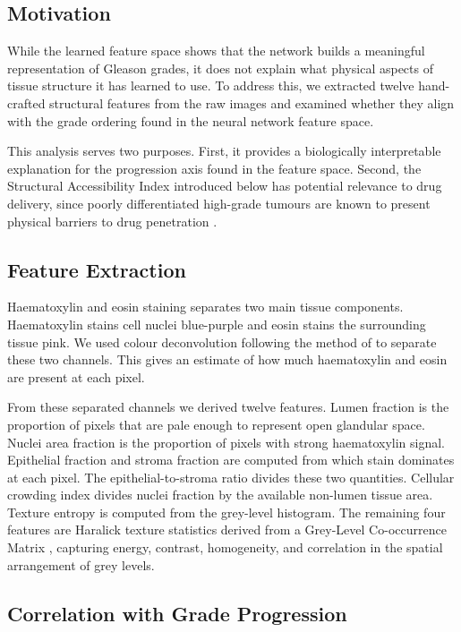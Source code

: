 \documentclass[12pt, a4paper]{article}
\begin{document}
\subsection{Motivation}

While the learned feature space shows that the network builds a meaningful
representation of Gleason grades, it does not explain what physical aspects of
tissue structure it has learned to use. To address this, we extracted twelve
hand-crafted structural features from the raw images and examined whether they
align with the grade ordering found in the neural network feature space.

This analysis serves two purposes. First, it provides a biologically interpretable
explanation for the progression axis found in the feature space. Second, the
Structural Accessibility Index introduced below has potential relevance to drug
delivery, since poorly differentiated high-grade tumours are known to present
physical barriers to drug penetration \citep{minchinton2006}.

\subsection{Feature Extraction}

Haematoxylin and eosin staining separates two main tissue components. Haematoxylin
stains cell nuclei blue-purple and eosin stains the surrounding tissue pink. We
used colour deconvolution following the method of \citet{ruifrok2001} to separate
these two channels. This gives an estimate of how much haematoxylin and eosin are
present at each pixel.

From these separated channels we derived twelve features. Lumen fraction is the
proportion of pixels that are pale enough to represent open glandular space.
Nuclei area fraction is the proportion of pixels with strong haematoxylin signal.
Epithelial fraction and stroma fraction are computed from which stain dominates
at each pixel. The epithelial-to-stroma ratio divides these two quantities.
Cellular crowding index divides nuclei fraction by the available non-lumen tissue
area. Texture entropy is computed from the grey-level histogram. The remaining
four features are Haralick texture statistics derived from a Grey-Level
Co-occurrence Matrix \citep{haralick1973}, capturing energy, contrast, homogeneity,
and correlation in the spatial arrangement of grey levels.

\subsection{Correlation with Grade Progression}
\end{document}
